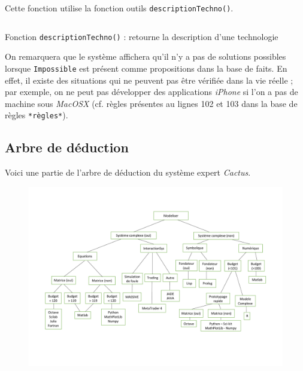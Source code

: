 \documentclass[a4paper,12pt]{article}
\begin{document}
Cette fonction utilise la fonction outils \texttt{descriptionTechno()}.


\begin{listing}[H]
	\centering
	\inputminted[breaklines=true,linenos,firstline=12]{lisp}{../afficherPropositions.lisp}
	\caption{Fonction \texttt{descriptionTechno()} : retourne la description d'une technologie}
\end{listing}


On remarquera que le système affichera qu'il n'y a pas de solutions possibles lorsque \texttt{Impossible} est présent comme propositions dans la base de faits. En effet, il existe des situations qui ne peuvent pas être vérifiée dans la vie réelle ; par exemple, on ne peut pas développer des applications \textit{iPhone} si l'on a pas de machine sous \textit{MacOSX} (cf. règles présentes au lignes 102 et 103 dans la base de règles \texttt{*règles*}).

\newpage
	\subsection{Arbre de déduction}
	
	Voici une partie de l'arbre de déduction du système expert \textit{Cactus}.
	\begin{figure}[H]
		\centering
		\includegraphics[scale=0.5]{graph_deduction.pdf}
	\end{figure}
	
\end{document}
